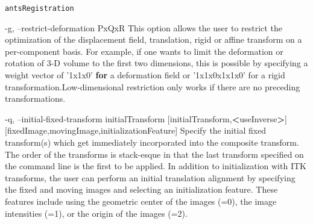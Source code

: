 \documentclass[ignorenonframetext,]{beamer}
\newenvironment{Shaded}{\begin{snugshade}}{\end{snugshade}}
\newcommand{\KeywordTok}[1]{\textcolor[rgb]{0.13,0.29,0.53}{\textbf{#1}}}
\newcommand{\StringTok}[1]{\textcolor[rgb]{0.31,0.60,0.02}{#1}}
\newcommand{\FunctionTok}[1]{\textcolor[rgb]{0.00,0.00,0.00}{#1}}
\newcommand{\OperatorTok}[1]{\textcolor[rgb]{0.81,0.36,0.00}{\textbf{#1}}}
\newcommand{\ExtensionTok}[1]{#1}
\newcommand{\NormalTok}[1]{#1}
\begin{document}
\begin{frame}[fragile]{\texttt{antsRegistration}}
\begin{Shaded}
\begin{Highlighting}[]
     \ExtensionTok{-g}\NormalTok{, --restrict-deformation PxQxR}
          \ExtensionTok{This}\NormalTok{ option allows the user to restrict the optimization of the displacement}
          \ExtensionTok{field}\NormalTok{, translation, rigid or affine transform on a per-component basis. For}
          \ExtensionTok{example}\NormalTok{, if one wants to limit the deformation or rotation of 3-D volume to the}
          \ExtensionTok{first}\NormalTok{ two dimensions, this is possible by specifying a weight vector of }\StringTok{'1x1x0'}
          \KeywordTok{for} \ExtensionTok{a}\NormalTok{ deformation field or }\StringTok{'1x1x0x1x1x0'}\NormalTok{ for a rigid}
          \ExtensionTok{transformation.Low-dimensional}\NormalTok{ restriction only works if there are no preceding}
          \ExtensionTok{transformations.}

     \ExtensionTok{-q}\NormalTok{, --initial-fixed-transform initialTransform}
\NormalTok{                                   [}\ExtensionTok{initialTransform}\NormalTok{,}\OperatorTok{<}\NormalTok{useInverse}\OperatorTok{>}\NormalTok{]}
\NormalTok{                                   [}\ExtensionTok{fixedImage}\NormalTok{,movingImage,initializationFeature]}
          \ExtensionTok{Specify}\NormalTok{ the initial fixed transform(s) }\FunctionTok{which}\NormalTok{ get immediately incorporated into}
          \ExtensionTok{the}\NormalTok{ composite transform. The order of the transforms is stack-esque in that the}
          \FunctionTok{last}\NormalTok{ transform specified on the command line is the first to be applied. In}
          \ExtensionTok{addition}\NormalTok{ to initialization with ITK transforms, the user can perform an initial}
          \ExtensionTok{translation}\NormalTok{ alignment by specifying the fixed and moving images and selecting an}
          \ExtensionTok{initialization}\NormalTok{ feature. These features include using the geometric center of the}
          \ExtensionTok{images}\NormalTok{ (=0), }\ExtensionTok{the}\NormalTok{ image intensities (=1), }\ExtensionTok{or}\NormalTok{ the origin of the images (=2)}\ExtensionTok{.}


\end{Highlighting}
\end{Shaded}
\end{frame}
\end{document}
